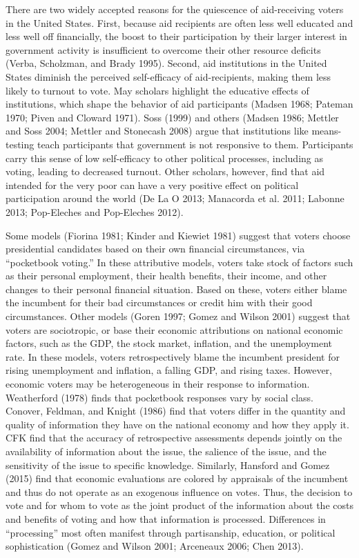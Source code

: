 \documentclass[12pt]{paper}
\begin{document}
There are two widely accepted reasons for the quiescence of aid-receiving voters in the United States. First, because aid recipients are often less well educated and less well off financially, the boost to their participation by their larger interest in government activity is insufficient to overcome their other resource deficits (Verba, Scholzman, and Brady 1995). Second, aid institutions in the United States diminish the perceived self-efficacy of aid-recipients, making them less likely to turnout to vote. May scholars highlight the educative effects of institutions, which shape the behavior of aid participants (Madsen 1968; Pateman 1970; Piven and Cloward 1971). Soss (1999) and others (Madsen 1986; Mettler and Soss 2004; Mettler and Stonecash 2008) argue that institutions like means-testing teach participants that government is not responsive to them. Participants carry this sense of low self-efficacy to other political processes, including as voting, leading to decreased turnout. Other scholars, however, find that aid intended for the very poor can have a very positive effect on political participation around the world (De La O 2013; Manacorda et al. 2011; Labonne 2013; Pop-Eleches and Pop-Eleches 2012).

Some models (Fiorina 1981; Kinder and Kiewiet 1981) suggest that voters choose presidential candidates based on their own financial circumstances, via “pocketbook voting.” In these attributive models, voters take stock of factors such as their personal employment, their health benefits, their income, and other changes to their personal financial situation. Based on these, voters either blame the incumbent for their bad circumstances or credit him with their good circumstances. Other models (Goren 1997; Gomez and Wilson 2001) suggest that voters are sociotropic, or base their economic attributions on national economic factors, such as the GDP, the stock market, inflation, and the unemployment rate. In these models, voters retrospectively blame the incumbent president for rising unemployment and inflation, a falling GDP, and rising taxes.  However, economic voters may be heterogeneous in their response to information. Weatherford (1978) finds that pocketbook responses vary by social class. Conover, Feldman, and Knight  (1986) find that voters differ in the quantity and quality of information they have on the national economy and how they apply it. CFK find that the accuracy of retrospective assessments depends jointly on the availability of information about the issue, the salience of the issue, and the sensitivity of the issue to specific knowledge. Similarly, Hansford and Gomez (2015) find that economic evaluations are colored by appraisals of the incumbent and thus do not operate as an exogenous influence on votes. Thus, the decision to vote and for whom to vote as the joint product of the information about the costs and benefits of voting and how that information is processed. Differences in “processing” most often manifest through partisanship, education, or political sophistication (Gomez and Wilson 2001; Arceneaux 2006; Chen 2013). 
\end{document}
